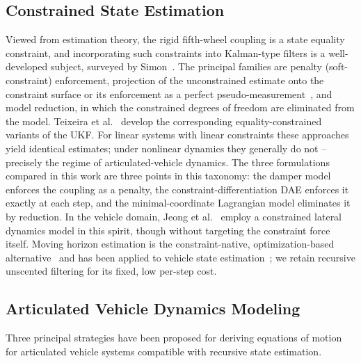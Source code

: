 \documentclass[conference]{IEEEtran}
\begin{document}
\subsection{Constrained State Estimation}
Viewed from estimation theory, the rigid fifth-wheel coupling is a state equality constraint, and incorporating such constraints into Kalman-type filters is a well-developed subject, surveyed by Simon~\cite{simon_kalman_2010}. The principal families are penalty (soft-constraint) enforcement, projection of the unconstrained estimate onto the constraint surface or its enforcement as a perfect pseudo-measurement~\cite{simon_kalman_2002}, and model reduction, in which the constrained degrees of freedom are eliminated from the model. Teixeira et al.~\cite{teixeira_state_2009} develop the corresponding equality-constrained variants of the UKF. For linear systems with linear constraints these approaches yield identical estimates; under nonlinear dynamics they generally do not -- precisely the regime of articulated-vehicle dynamics. The three formulations compared in this work are three points in this taxonomy: the damper model enforces the coupling as a penalty, the constraint-differentiation DAE enforces it exactly at each step, and the minimal-coordinate Lagrangian model eliminates it by reduction. In the vehicle domain, Jeong et al.~\cite{jeong_estimation_2022} employ a constrained lateral dynamics model in this spirit, though without targeting the constraint force itself. Moving horizon estimation is the constraint-native, optimization-based alternative~\cite{rao_constrained_2003} and has been applied to vehicle state estimation~\cite{brembeck_nonlinear_2019}; we retain recursive unscented filtering for its fixed, low per-step cost.

\subsection{Articulated Vehicle Dynamics Modeling}

Three principal strategies have been proposed for deriving equations of motion for articulated vehicle systems compatible with recursive state estimation.
\end{document}
